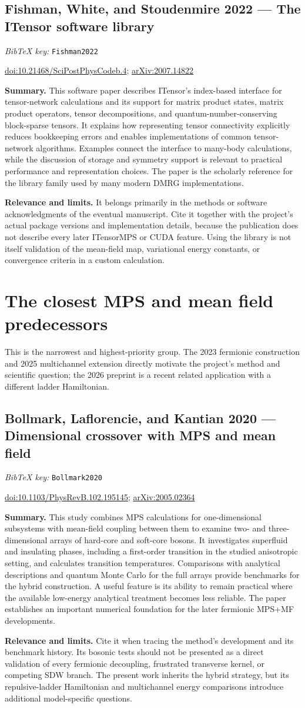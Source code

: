 \documentclass[11pt]{article}
\newcommand{\paper}[2]{\Needspace{8\baselineskip}\subsection{#2}\label{paper:#1}\textit{BibTeX key:} \texttt{#1}\quad\citep{#1}\par}
\newcommand{\doi}[1]{\href{https://doi.org/#1}{doi:#1}}
\newcommand{\arxiv}[1]{\href{https://arxiv.org/abs/#1}{arXiv:#1}}
\newcommand{\summary}{\par\textbf{Summary.} }
\newcommand{\relevance}{\par\textbf{Relevance and limits.} }
\begin{document}
\paper{Fishman2022}{Fishman, White, and Stoudenmire 2022 --- The ITensor software library}
\doi{10.21468/SciPostPhysCodeb.4}; \arxiv{2007.14822}
\summary This software paper describes ITensor's index-based interface for tensor-network calculations and its support for matrix product states, matrix product operators, tensor decompositions, and quantum-number-conserving block-sparse tensors. It explains how representing tensor connectivity explicitly reduces bookkeeping errors and enables implementations of common tensor-network algorithms. Examples connect the interface to many-body calculations, while the discussion of storage and symmetry support is relevant to practical performance and representation choices. The paper is the scholarly reference for the library family used by many modern DMRG implementations.
\relevance It belongs primarily in the methods or software acknowledgments of the eventual manuscript. Cite it together with the project's actual package versions and implementation details, because the publication does not describe every later ITensorMPS or CUDA feature. Using the library is not itself validation of the mean-field map, variational energy constants, or convergence criteria in a custom calculation.

\section{The closest MPS and mean field predecessors}
This is the narrowest and highest-priority group. The 2023 fermionic construction and 2025 multichannel extension directly motivate the project's method and scientific question; the 2026 preprint is a recent related application with a different ladder Hamiltonian.

\paper{Bollmark2020}{Bollmark, Laflorencie, and Kantian 2020 --- Dimensional crossover with MPS and mean field}
\doi{10.1103/PhysRevB.102.195145}; \arxiv{2005.02364}
\summary This study combines MPS calculations for one-dimensional subsystems with mean-field coupling between them to examine two- and three-dimensional arrays of hard-core and soft-core bosons. It investigates superfluid and insulating phases, including a first-order transition in the studied anisotropic setting, and calculates transition temperatures. Comparisons with analytical descriptions and quantum Monte Carlo for the full arrays provide benchmarks for the hybrid construction. A useful feature is its ability to remain practical where the available low-energy analytical treatment becomes less reliable. The paper establishes an important numerical foundation for the later fermionic MPS+MF developments.
\relevance Cite it when tracing the method's development and its benchmark history. Its bosonic tests should not be presented as a direct validation of every fermionic decoupling, frustrated transverse kernel, or competing SDW branch. The present work inherits the hybrid strategy, but its repulsive-ladder Hamiltonian and multichannel energy comparisons introduce additional model-specific questions.
\end{document}
